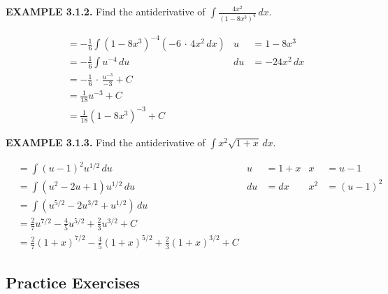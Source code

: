 \documentclass[12pt]{article}
\newcommand{\follow}{\bigskip\noindent}
\newcommand{\point}{\,\cdot\,}
\newcommand{\mins}{-}
\newcommand{\inline}[1]{\({#1}\)}
\begin{document}
        \follow\textbf{EXAMPLE 3.1.2.}
        Find the antiderivative of \inline{\int{} \frac{4x^2}{{(1 \mins{} 8x^3)}^4} \, dx}.

        \begin{align*}
            &= \mins{} \frac{1}{6} \int{} {(1 \mins{} 8x^3)}^{\mins{} 4} (\mins{} 6 \point{} 4x^2 \, dx)    & u &= 1 \mins{} 8x^3 \\
            &= \mins{} \frac{1}{6} \int{} u^{\mins{} 4} \, du                                               & du &= \mins{} 24x^2 \, dx \\
            &= \mins{} \frac{1}{6} \point{} \frac{u^{\mins{} 3}}{\mins{} 3} + C \\
            &= \frac{1}{18} u^{\mins{} 3} + C \\
            &= \frac{1}{18} {(1 \mins{} 8x^3)}^{\mins{} 3} + C
        \end{align*}
        
        \follow\textbf{EXAMPLE 3.1.3.}
        Find the antiderivative of \inline{\int{} x^2 \sqrt{1 + x} \, dx}.

        \begin{align*}
            &= \int{} {(u \mins{} 1)}^2 u^{1/2} \, du                                                               & u &= 1 + x        & x &= u \mins{} 1 \\
            &= \int{} {(u^2 \mins{} 2u + 1)} u^{1/2} \, du                                                          & du &= dx          & x^2 &= {(u \mins{} 1)}^2 \\
            &= \int{} (u^{5/2} \mins{} 2u^{3/2} + u^{1/2}) \, du                                                    \\
            &= \frac{2}{7} u^{7/2} \mins{} \frac{4}{5} u^{5/2} + \frac{2}{3} u^{3/2} + C                            \\
            &= \frac{2}{7} {(1 + x)}^{7/2} \mins{} \frac{4}{5} {(1 + x)}^{5/2} + \frac{2}{3} {(1 + x)}^{3/2} + C
        \end{align*}
    
    \newpage\subsection*{Practice Exercises}
\end{document}
